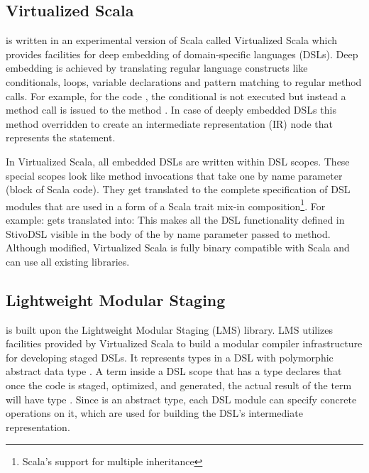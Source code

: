 \subsection{Virtualized Scala}
\label{subsec:virtualized-scala}
\tool is written in an experimental version of Scala called Virtualized Scala
\cite{moors_scala-virtualized_2012} which provides facilities for deep embedding
of domain-specific languages (DSLs). Deep embedding is achieved by translating
regular language constructs like conditionals, loops, variable declarations and
pattern matching to regular method calls. For example, for the code , the conditional is not executed but instead a method call is issued
to the method . In case of deeply
embedded DSLs this method overridden to create an intermediate
representation (IR) node that represents the  statement.

In Virtualized Scala, all embedded DSLs are written within DSL scopes. These
special scopes look like method invocations that take one by name parameter
(block of Scala code). They get translated to the complete specification of DSL
modules that are used in a form of a Scala trait mix-in
composition\footnote[1]{Scala's support for multiple inheritance}. For example:
 gets translated into:
This makes all the DSL functionality defined in StivoDSL visible in the body of
the by name parameter passed to \tool method.
Although modified, Virtualized Scala is fully binary compatible with Scala and
can use all existing libraries.


\subsection{Lightweight Modular Staging}
\label{subsec:lightweight-modular-staging}

\tool is built upon the Lightweight Modular Staging (LMS) library. LMS utilizes
facilities provided by Virtualized Scala to build a modular compiler
infrastructure for developing staged DSLs. It represents types in a DSL with
polymorphic abstract data type . A term inside a DSL scope that has
a type  declares that once the code is staged, optimized, and
generated, the actual result of the term will have type . Since
 is an abstract type, each DSL module can specify concrete
operations on it, which are used for building the DSL's intermediate
representation.

